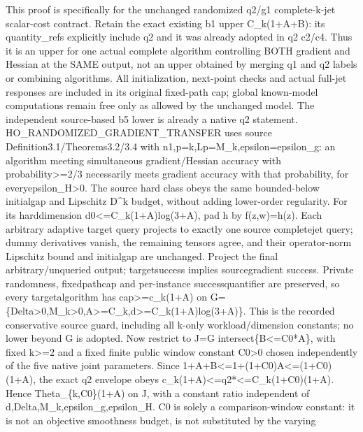 \documentclass[10pt,a4paper]{article}
\begin{document}
\begingroup\raggedright\sloppy This proof is specifically for the unchanged randomized q2/\allowbreak{}g1 complete-k-jet scalar-cost contract. Retain the exact existing b1 upper C\_\allowbreak{}k(1+A+B):\allowbreak{} its quantity\_\allowbreak{}refs explicitly include q2 and it was already adopted in q2 c2/\allowbreak{}c4. Thus it is an upper for one actual complete algorithm controlling BOTH gradient and Hessian at the SAME output,\allowbreak{} not an upper obtained by merging q1 and q2 labels or combining algorithms. All initialization,\allowbreak{} next-point checks and actual full-jet responses are included in its original fixed-path cap;\allowbreak{} global known-model computations remain free only as allowed by the unchanged model. The independent source-based b5 lower is already a native q2 statement. HO\_\allowbreak{}RANDOMIZED\_\allowbreak{}GRADIENT\_\allowbreak{}TRANSFER uses source Definition3.1/\allowbreak{}Theorems3.2/\allowbreak{}3.4 with n1,\allowbreak{}p=\allowbreak{}k,\allowbreak{}Lp=\allowbreak{}M\_\allowbreak{}k,\allowbreak{}epsilon=\allowbreak{}epsilon\_\allowbreak{}g:\allowbreak{} an algorithm meeting simultaneous gradient/\allowbreak{}Hessian accuracy with probability>=\allowbreak{}2/\allowbreak{}3 necessarily meets gradient accuracy with that probability,\allowbreak{} for everyepsilon\_\allowbreak{}H>0. The source hard class obeys the same bounded-below initialgap and Lipschitz D\textasciicircum{}k budget,\allowbreak{} without adding lower-order regularity. For its harddimension d0<=\allowbreak{}C\_\allowbreak{}k(1+A)log(3+A),\allowbreak{} pad h by f(z,\allowbreak{}w)=\allowbreak{}h(z). Each arbitrary adaptive target query projects to exactly one source completejet query;\allowbreak{} dummy derivatives vanish,\allowbreak{} the remaining tensors agree,\allowbreak{} and their operator-norm Lipschitz bound and initialgap are unchanged. Project the final arbitrary/\allowbreak{}unqueried output;\allowbreak{} targetsuccess implies sourcegradient success. Private randomness,\allowbreak{} fixedpathcap and per-instance successquantifier are preserved,\allowbreak{} so every targetalgorithm has cap>=\allowbreak{}c\_\allowbreak{}k(1+A) on G=\allowbreak{}\{Delta>0,\allowbreak{}M\_\allowbreak{}k>0,\allowbreak{}A>=\allowbreak{}C\_\allowbreak{}k,\allowbreak{}d>=\allowbreak{}C\_\allowbreak{}k(1+A)log(3+A)\}. This is the recorded conservative source guard,\allowbreak{} including all k-only workload/\allowbreak{}dimension constants;\allowbreak{} no lower beyond G is adopted. Now restrict to J=\allowbreak{}G intersect\{B<=\allowbreak{}C0*A\},\allowbreak{} with fixed k>=\allowbreak{}2 and a fixed finite public window constant C0>0 chosen independently of the five native joint parameters. Since 1+A+B<=\allowbreak{}1+(1+C0)A<=\allowbreak{}(1+C0)(1+A),\allowbreak{} the exact q2 envelope obeys c\_\allowbreak{}k(1+A)<=\allowbreak{}q2*<=\allowbreak{}C\_\allowbreak{}k(1+C0)(1+A). Hence Theta\_\allowbreak{}\{k,\allowbreak{}C0\}(1+A) on J,\allowbreak{} with a constant ratio independent of d,\allowbreak{}Delta,\allowbreak{}M\_\allowbreak{}k,\allowbreak{}epsilon\_\allowbreak{}g,\allowbreak{}epsilon\_\allowbreak{}H. C0 is solely a comparison-window constant:\allowbreak{} it is not an objective smoothness budget,\allowbreak{} is not substituted by the varying 
\end{document}
